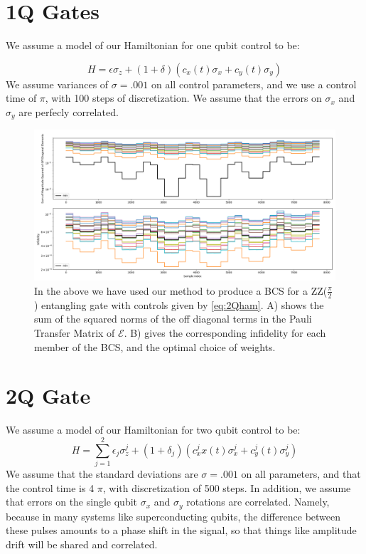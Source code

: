 \documentclass[aps,nofootinbib,pra,notitlepage,twocolumn]{revtex4-1}
\begin{document}
\section{1Q Gates}
We assume a model of our Hamiltonian for one qubit control to be:

\begin{equation}\label{eq:1Qham}
H = \epsilon\sigma_z + (1 + \delta)(c_x(t)\sigma_x + c_y(t)\sigma_y)
\end{equation}
We assume variances of $\sigma = .001$ on all control parameters, and we use a control time of $\pi$, with 100 steps of discretization. We assume that the errors on $\sigma_x$ and $\sigma_y$ are perfecly correlated.
\begin{figure}
\centering
\includegraphics[width=\textwidth]{2Q.png}
\caption{In the above we have used our method to produce a BCS for a ZZ($\frac{\pi}{2}$) entangling gate with controls given by \ref{eq:2Qham}. A) shows the sum of the squared norms of the off diagonal terms in the Pauli Transfer Matrix of $\mathcal{E}$. B) gives the corresponding infidelity for each member of the BCS, and the optimal choice of weights.}
\end{figure}

\section{2Q Gate}
We assume a model of our Hamiltonian for two qubit control to be:
\begin{equation} \label{eq:2Qham}
H = \sum_{j=1}^2\epsilon_j\sigma_z^j + (1 + \delta_j)(c_x^jx(t)\sigma_x^j + c_y^j(t)\sigma_y^j)
\end{equation}
We assume that the standard deviations are $\sigma = .001$ on all parameters, and that the control time is 4 $\pi$, with discretization of 500 steps. In addition, we assume that errors on the single qubit $\sigma_x$ and $\sigma_y$ rotations are correlated. Namely, because in many systems like superconducting qubits, the difference between these pulses amounts to a phase shift in the signal, so that things like amplitude drift will be shared and correlated.




\end{document}
